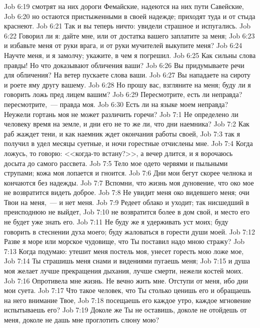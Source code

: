 \vs Job 6:19 смотрят на них дороги Фемайские, надеются на них пути Савейские,
\vs Job 6:20 но остаются пристыженными в своей надежде; приходят туда и от стыда краснеют.
\vs Job 6:21 Так и вы теперь ничто: увидели страшное и испугались.
\vs Job 6:22 Говорил ли я: дайте мне, или от достатка вашего заплатите за меня;
\vs Job 6:23 и избавьте меня от руки врага, и от руки мучителей выкупите меня?
\vs Job 6:24 Научте меня, и я замолчу; укажите, в чем я погрешил.
\vs Job 6:25 Как сильны слова правды! Но что доказывают обличения ваши?
\vs Job 6:26 Вы придумываете речи для обличения? На ветер пускаете слова ваши.
\vs Job 6:27 Вы нападаете на сироту и роете яму другу вашему.
\vs Job 6:28 Но прошу вас, взгляните на меня; буду ли я говорить ложь пред лицем вашим?
\vs Job 6:29 Пересмотрите, есть ли неправда? пересмотрите,~--- правда моя.
\vs Job 6:30 Есть ли на языке моем неправда? Неужели гортань моя не может различить горечи?
\vs Job 7:1 Не определено ли человеку время на земле, и дни его не то же ли, что дни наемника?
\vs Job 7:2 Как раб жаждет тени, и как наемник ждет окончания работы своей,
\vs Job 7:3 так я получил в удел месяцы суетные, и ночи горестные отчислены мне.
\vs Job 7:4 Когда ложусь, то говорю: <<когда-то встану?>>, а вечер длится, и я ворочаюсь досыта до самого рассвета.
\vs Job 7:5 Тело мое одето червями и пыльными струпами; кожа моя лопается и гноится.
\vs Job 7:6 Дни мои бегут скорее челнока и кончаются без надежды.
\vs Job 7:7 Вспомни, что жизнь моя дуновение, что око мое не возвратится видеть доброе.
\vs Job 7:8 Не увидит меня око видевшего меня; очи Твои на меня,~--- и нет меня.
\vs Job 7:9 Редеет облако и уходит; так нисшедший в преисподнюю не выйдет,
\vs Job 7:10 не возвратится более в дом свой, и место его не будет уже знать его.
\vs Job 7:11 Не буду же я удерживать уст моих; буду говорить в стеснении духа моего; буду жаловаться в горести души моей.
\vs Job 7:12 Разве я море или морское чудовище, что Ты поставил надо мною стражу?
\vs Job 7:13 Когда подумаю: утешит меня постель моя, унесет горесть мою ложе мое,
\vs Job 7:14 Ты страшишь меня снами и видениями пугаешь меня;
\vs Job 7:15 и душа моя желает лучше прекращения дыхания, лучше смерти, нежели  костей моих.
\vs Job 7:16 Опротивела мне жизнь. Не вечно жить мне. Отступи от меня, ибо дни мои суета.
\vs Job 7:17 Что такое человек, что Ты столько ценишь его и обращаешь на него внимание Твое,
\vs Job 7:18 посещаешь его каждое утро, каждое мгновение испытываешь его?
\vs Job 7:19 Доколе же Ты не оставишь, доколе не отойдешь от меня, доколе не дашь мне проглотить слюну мою?

